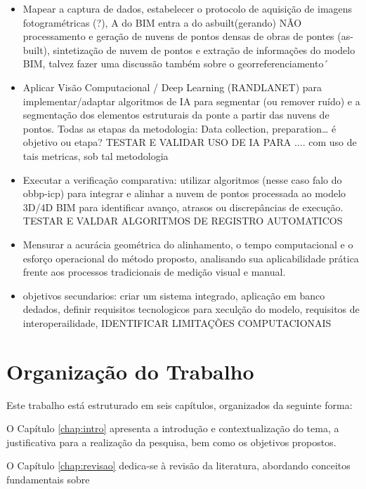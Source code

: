\begin{itemize}
	\item Mapear a captura de dados, estabelecer o protocolo de aquisição de imagens fotogramétricas (?), A do BIM entra a do asbuilt(gerando) NÃO processamento e geração de nuvens de pontos densas de obras de pontes (as-built), sintetização de nuvem de pontos e extração de informações do modelo BIM, talvez fazer uma discussão também sobre o georreferenciamento´
	
	\item Aplicar Visão Computacional / Deep Learning (RANDLANET) para implementar/adaptar algoritmos de IA para segmentar (ou remover ruído) e a segmentação dos elementos estruturais da ponte a partir das nuvens de pontos. Todas as etapas da metodologia: Data collection, preparation… é objetivo ou etapa? TESTAR E VALIDAR USO DE IA PARA .... com uso de tais metricas, sob tal metodologia
	
	\item Executar a verificação comparativa: utilizar algoritmos (nesse caso falo do obbp-icp) para integrar e alinhar a nuvem de pontos processada ao modelo 3D/4D BIM para identificar avanço, atrasos ou discrepâncias de execução. TESTAR E VALDAR ALGORITMOS DE REGISTRO AUTOMATICOS
	
	\item Mensurar a acurácia geométrica do alinhamento, o tempo computacional e o esforço operacional do método proposto, analisando sua aplicabilidade prática frente aos processos tradicionais de medição visual e manual.
	
	\item objetivos secundarios: criar um sistema integrado, aplicação em banco dedados, definir requisitos tecnologicos para xeculção do modelo, requisitos de interoperailidade, IDENTIFICAR LIMITAÇÕES COMPUTACIONAIS
	
\end{itemize}

\section{Organização do Trabalho}
\label{sec:organizacao}
Este trabalho está estruturado em seis capítulos, organizados da seguinte forma:

O Capítulo \ref{chap:intro} apresenta a introdução e contextualização do tema, a justificativa para a realização da pesquisa, bem como os objetivos propostos.

O Capítulo \ref{chap:revisao} dedica-se à revisão da literatura, abordando conceitos fundamentais sobre

